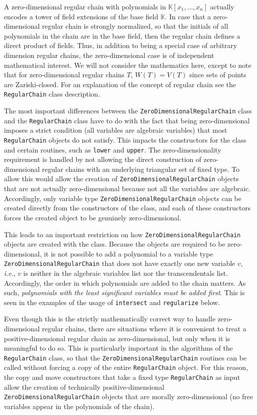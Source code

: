 A zero-dimensional regular chain with polynomials in $\mathbb{K}[x_1,\ldots,x_n]$ actually encodes a tower of field extensions of the base field $\mathbb{K}$. In case that a zero-dimensional regular chain is strongly normalized, so that the initials of all polynomials in the chain are in the base field, then the regular chain defines a direct product of fields. Thus, in addition to being a special case of arbitrary dimension regular chains, the zero-dimensional case is of independent mathematical interest. We will not consider the mathematics here, except to note that for zero-dimensional regular chains $T$, $W(T)=V(T)$ since sets of points are Zariski-closed. For an explanation of the concept of regular chain see the \texttt{RegularChain} class description.

The most important differences between the \texttt{Zero\-Dimensional\-Regular\-Chain} class and the \texttt{RegularChain} class have to do with the fact that being zero-dimensional imposes a strict condition (all variables are algebraic variables) that most \texttt{RegularChain} objects do not satisfy. This impacts the constructors for the class and certain routines, such as \texttt{lower} and \texttt{upper}. The zero-dimensionality requirement is handled by not allowing the direct construction of zero-dimensional regular chains with an underlying triangular set of fixed type. To allow this would allow the creation of \texttt{ZeroDimensionalRegularChain} objects that are not actually zero-dimensional because not all the variables are algebraic. Accordingly, only variable type \texttt{ZeroDimensionalRegularChain} objects can be created directly from the constructors of the class, and each of these constructors forces the created object to be genuinely zero-dimensional.

This leads to an important restriction on how \texttt{Zero\-Dimensional\-Regular\-Chain} objects are created with the class. Because the objects are required to be zero-dimensional, it is not possible to add a polynomial to a variable type \texttt{ZeroDimensionalRegularChain} that does not have exactly one new variable $v$, \emph{i.e.}, $v$ is neither in the algebraic variables list nor the transcendentals list. Accordingly, the order in which polynomials are added to the chain matters. As such, \emph{polynomials with the least significant variables must be added first}. This is seen in the examples of the usage of \texttt{intersect} and \texttt{regularize} below.

Even though this is the strictly mathematically correct way to handle zero-dimensional regular chains, there are situations where it is convenient to treat a positive-dimensional regular chain as zero-dimensional, but only when it is meaningful to do so. This is particularly important in the algorithms of the \texttt{RegularChain} class, so that the \texttt{ZeroDimensionalRegularChain} routines can be called without forcing a copy of the entire  \texttt{RegularChain} object. For this reason, the copy and move constructors that take a fixed type \texttt{RegularChain} as input allow the creation of technically positive-dimensional \texttt{Zero\-Dimensional\-Regular\-Chain} objects that are morally zero-dimensional (no free variables appear in the polynomials of the chain).

